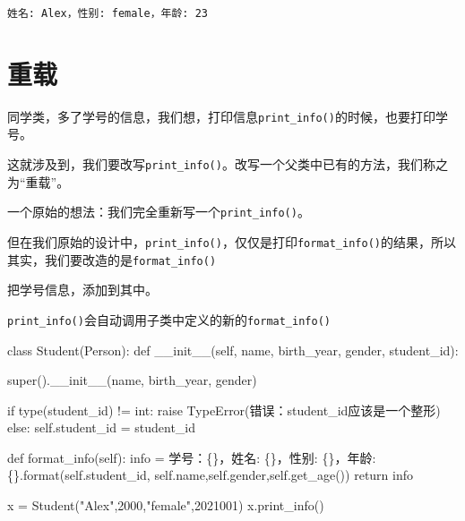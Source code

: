 \documentclass[
  letterpaper,
  DIV=11,
  numbers=noendperiod]{scrreprt}
\newenvironment{Shaded}{\begin{snugshade}}{\end{snugshade}}
\newcommand{\BuiltInTok}[1]{\textcolor[rgb]{0.00,0.23,0.31}{#1}}
\newcommand{\ControlFlowTok}[1]{\textcolor[rgb]{0.00,0.23,0.31}{#1}}
\newcommand{\DecValTok}[1]{\textcolor[rgb]{0.68,0.00,0.00}{#1}}
\newcommand{\FunctionTok}[1]{\textcolor[rgb]{0.28,0.35,0.67}{#1}}
\newcommand{\KeywordTok}[1]{\textcolor[rgb]{0.00,0.23,0.31}{#1}}
\newcommand{\NormalTok}[1]{\textcolor[rgb]{0.00,0.23,0.31}{#1}}
\newcommand{\OperatorTok}[1]{\textcolor[rgb]{0.37,0.37,0.37}{#1}}
\newcommand{\PreprocessorTok}[1]{\textcolor[rgb]{0.68,0.00,0.00}{#1}}
\newcommand{\SpecialCharTok}[1]{\textcolor[rgb]{0.37,0.37,0.37}{#1}}
\newcommand{\StringTok}[1]{\textcolor[rgb]{0.13,0.47,0.30}{#1}}
\newcommand{\VariableTok}[1]{\textcolor[rgb]{0.07,0.07,0.07}{#1}}
\begin{document}
\begin{verbatim}
姓名: Alex，性别: female，年龄: 23
\end{verbatim}

\hypertarget{ux91cdux8f7d}{%
\section{重载}\label{ux91cdux8f7d}}

同学类，多了学号的信息，我们想，打印信息\texttt{print\_info()}的时候，也要打印学号。

这就涉及到，我们要改写\texttt{print\_info()}。改写一个父类中已有的方法，我们称之为``重载''。

一个原始的想法：我们完全重新写一个\texttt{print\_info()}。

但在我们原始的设计中，\texttt{print\_info()}，仅仅是打印\texttt{format\_info()}的结果，所以其实，我们要改造的是\texttt{format\_info()}

把学号信息，添加到其中。

\texttt{print\_info()}会自动调用子类中定义的新的\texttt{format\_info()}

\begin{Shaded}
\begin{Highlighting}[]
\KeywordTok{class}\NormalTok{ Student(Person):}
    \KeywordTok{def} \FunctionTok{\_\_init\_\_}\NormalTok{(}\VariableTok{self}\NormalTok{, name, birth\_year, gender, student\_id):}
        
        \BuiltInTok{super}\NormalTok{().}\FunctionTok{\_\_init\_\_}\NormalTok{(name, birth\_year, gender)}
        
        \ControlFlowTok{if} \BuiltInTok{type}\NormalTok{(student\_id) }\OperatorTok{!=} \BuiltInTok{int}\NormalTok{:}
            \ControlFlowTok{raise} \PreprocessorTok{TypeError}\NormalTok{(}\StringTok{\textquotesingle{}错误：student\_id应该是一个整形\textquotesingle{}}\NormalTok{)}
        \ControlFlowTok{else}\NormalTok{:}
            \VariableTok{self}\NormalTok{.student\_id }\OperatorTok{=}\NormalTok{ student\_id}

    \KeywordTok{def}\NormalTok{ format\_info(}\VariableTok{self}\NormalTok{):}
\NormalTok{        info }\OperatorTok{=} \StringTok{\textquotesingle{}学号：}\SpecialCharTok{\{\}}\StringTok{，姓名: }\SpecialCharTok{\{\}}\StringTok{，性别: }\SpecialCharTok{\{\}}\StringTok{，年龄: }\SpecialCharTok{\{\}}\StringTok{\textquotesingle{}}\NormalTok{.}\BuiltInTok{format}\NormalTok{(}\VariableTok{self}\NormalTok{.student\_id,}
        \VariableTok{self}\NormalTok{.name,}\VariableTok{self}\NormalTok{.gender,}\VariableTok{self}\NormalTok{.get\_age())}
        \ControlFlowTok{return}\NormalTok{ info}

\NormalTok{x }\OperatorTok{=}\NormalTok{ Student(}\StringTok{"Alex"}\NormalTok{,}\DecValTok{2000}\NormalTok{,}\StringTok{"female"}\NormalTok{,}\DecValTok{2021001}\NormalTok{)}
\NormalTok{x.print\_info()}
\end{Highlighting}
\end{Shaded}
\end{document}
